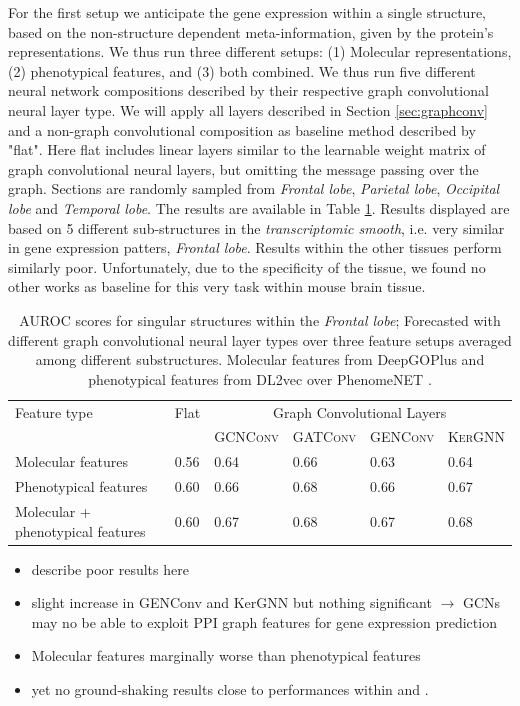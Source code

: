 \documentclass[]{article}
\renewcommand{\cite}{\citep}
\begin{document}
For the first setup we anticipate the gene expression within a single structure, based on the non-structure dependent meta-information, given by the protein's representations. We thus run three different setups: (1) Molecular representations, (2) phenotypical features, and (3) both combined. We thus run five different neural network compositions described by their respective graph convolutional neural layer type. We will apply all layers described in Section \ref{sec:graphconv} and a non-graph convolutional composition as baseline method described by "flat". Here flat includes linear layers similar to the learnable weight matrix of graph convolutional neural layers, but omitting the message passing over the graph. Sections are randomly sampled from \textit{Frontal lobe}, \textit{Parietal lobe}, \textit{Occipital lobe } and \textit{Temporal lobe}. The results are available in Table \ref{tab:geneexp_pred}. Results displayed are based on 5 different sub-structures in the \textit{transcriptomic smooth}, i.e. very similar in gene expression patters, \textit{Frontal lobe}. Results within the other tissues perform similarly poor. Unfortunately, due to the specificity of the tissue, we found no other works as baseline for this very task within mouse brain tissue.

\begin{table}
	\centering
	\renewcommand{\arraystretch}{1.5}
	\begin{tabular}{l|l|llll}
		Feature type&Flat&\multicolumn{4}{|c}{Graph Convolutional Layers}\\
		&&\multicolumn{1}{|l}{\textsc{GCNConv}}&\textsc{GATConv}&\textsc{GENConv}&\textsc{KerGNN}\\
		\hline
		Molecular features&0.56&0.64&0.66&0.63&0.64\\
		Phenotypical features&0.60&0.66&0.68&0.66&0.67\\
		Molecular + phenotypical features &0.60&0.67&0.68&0.67&0.68\\
	\end{tabular}

	\caption{AUROC scores for singular structures within the \textit{Frontal lobe}; Forecasted with different graph convolutional neural layer types over three feature setups averaged among different substructures. Molecular features from DeepGOPlus \cite{DeepGoPlus} and phenotypical features from DL2vec \cite{DL2vec2020} over PhenomeNET \cite{PhenomeNET2011}. }
	\label{tab:geneexp_pred}
\end{table}

\begin{itemize}
	\item describe poor results here
	\item slight increase in GENConv and KerGNN but nothing significant $\rightarrow$ GCNs may no be able to exploit PPI graph features for gene expression prediction
	\item Molecular features marginally worse than phenotypical features
	\item yet no ground-shaking results close to performances within \citet{schulte2021integration} and \citet{wang2021mogonet}.
\end{itemize}
\end{document}
